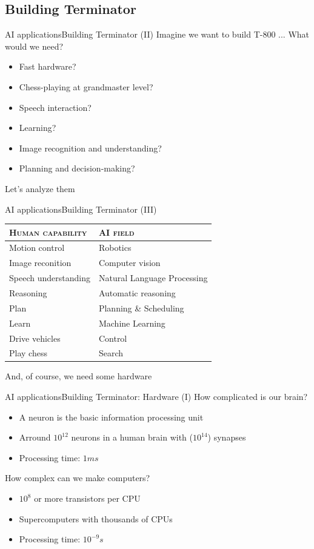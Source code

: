 \documentclass[10pt,compress]{beamer} %
\begin{document}
\subsection{Building Terminator}
\begin{frame}{AI applications}{Building Terminator (II)}
	Imagine we want to build T-800 ... What would we need?
	\begin{itemize}
		\item Fast hardware?
		\item Chess-playing at grandmaster level?
		\item Speech interaction?
		\item Learning?
		\item Image recognition and understanding?
		\item Planning and decision-making?
	\end{itemize}
	Let's analyze them
\end{frame}

\begin{frame}{AI applications}{Building Terminator (III)}
    \begin{table}
    \centering
    \begin{tabular}{l|l}
    \textsc{Human capability} & \textsc{AI field} \\\hline
    Motion control & Robotics \\
    Image reconition & Computer vision \\
    Speech understanding & Natural Language Processing \\
    Reasoning & Automatic reasoning \\
    Plan & Planning \& Scheduling \\
    Learn & Machine Learning \\
    Drive vehicles & Control \\
    Play chess & Search \\
    \end{tabular}
    \end{table}

    And, of course, we need some hardware
\end{frame}


\begin{frame}{AI applications}{Building Terminator: Hardware (I)}
	How complicated is our brain?
	\begin{itemize}
		\item A neuron is the basic information processing unit
		\item Arround $10^{12}$ neurons in a human brain with ($10^{14}$) synapses 
		\item Processing time: $1 ms$
	\end{itemize}
	How complex can we make computers?
	\begin{itemize}
		\item $10^8$ or more transistors per CPU
		\item Supercomputers with thousands of CPUs
		\item Processing time: $10^{-9}s$
	\end{itemize}
\end{frame}
\end{document}
